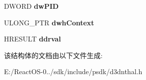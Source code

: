 \begin{DoxyCompactItemize}
\begin{tabbing}
\end{tabbing}\item 
\mbox{\label{struct___d3_d_n_t_h_a_l___c_o_n_t_e_x_t_c_r_e_a_t_e_d_a_t_a_a26ef495f47ceaff4b2f34007af9b7f30}} 
D\+W\+O\+RD {\bfseries dw\+P\+ID}
\item 
\mbox{\label{struct___d3_d_n_t_h_a_l___c_o_n_t_e_x_t_c_r_e_a_t_e_d_a_t_a_ad0bbe76b8ee2b4a6c2f4536decc5cdd0}} 
U\+L\+O\+N\+G\+\_\+\+P\+TR {\bfseries dwh\+Context}
\item 
\mbox{\label{struct___d3_d_n_t_h_a_l___c_o_n_t_e_x_t_c_r_e_a_t_e_d_a_t_a_a150724f22cfc057104d09f6ebe6b3e69}} 
H\+R\+E\+S\+U\+LT {\bfseries ddrval}
\end{DoxyCompactItemize}


该结构体的文档由以下文件生成\+:\begin{DoxyCompactItemize}
\item 
E\+:/\+React\+O\+S-\/0../sdk/include/psdk/d3dnthal.\+h\end{DoxyCompactItemize}
